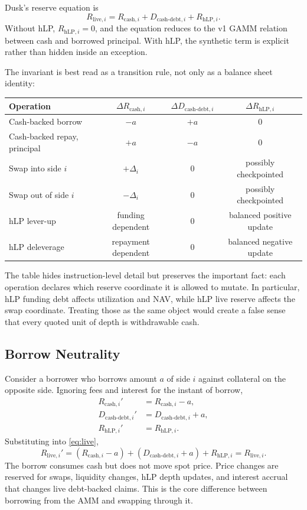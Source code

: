 \documentclass[11pt]{article}
\newcommand{\cash}{\mathrm{cash}}
\newcommand{\live}{\mathrm{live}}
\newcommand{\hlp}{\mathrm{hLP}}
\newcommand{\debt}{\mathrm{debt}}
\begin{document}
Dusk's reserve equation is
\begin{equation}
\boxed{R_{\live,i}=R_{\cash,i}+D_{\cash\text{-}\debt,i}+R_{\hlp,i}.}
\label{eq:live}
\end{equation}
Without hLP, $R_{\hlp,i}=0$, and the equation reduces to the v1 GAMM relation between cash and borrowed principal. With hLP, the synthetic term is explicit rather than hidden inside an exception.

The invariant is best read as a transition rule, not only as a balance sheet identity:
\begin{center}
\begin{tabular}{lccc}
\toprule
Operation & $\Delta R_{\cash,i}$ & $\Delta D_{\cash\text{-}\debt,i}$ & $\Delta R_{\hlp,i}$ \\
\midrule
Cash-backed borrow & $-a$ & $+a$ & $0$ \\
Cash-backed repay, principal & $+a$ & $-a$ & $0$ \\
Swap into side $i$ & $+\Delta_i$ & $0$ & possibly checkpointed \\
Swap out of side $i$ & $-\Delta_i$ & $0$ & possibly checkpointed \\
hLP lever-up & funding dependent & $0$ & balanced positive update \\
hLP deleverage & repayment dependent & $0$ & balanced negative update \\
\bottomrule
\end{tabular}
\end{center}
The table hides instruction-level detail but preserves the important fact: each operation declares which reserve coordinate it is allowed to mutate. In particular, hLP funding debt affects utilization and NAV, while hLP live reserve affects the swap coordinate. Treating those as the same object would create a false sense that every quoted unit of depth is withdrawable cash.

\subsection{Borrow Neutrality}

Consider a borrower who borrows amount $a$ of side $i$ against collateral on the opposite side. Ignoring fees and interest for the instant of borrow,
\begin{align}
R_{\cash,i}' &= R_{\cash,i}-a,\\
D_{\cash\text{-}\debt,i}' &= D_{\cash\text{-}\debt,i}+a,\\
R_{\hlp,i}' &= R_{\hlp,i}.
\end{align}
Substituting into \eqref{eq:live},
\begin{equation}
R_{\live,i}'=(R_{\cash,i}-a)+(D_{\cash\text{-}\debt,i}+a)+R_{\hlp,i}=R_{\live,i}.
\end{equation}
The borrow consumes cash but does not move spot price. Price changes are reserved for swaps, liquidity changes, hLP depth updates, and interest accrual that changes live debt-backed claims. This is the core difference between borrowing from the AMM and swapping through it.
\end{document}
